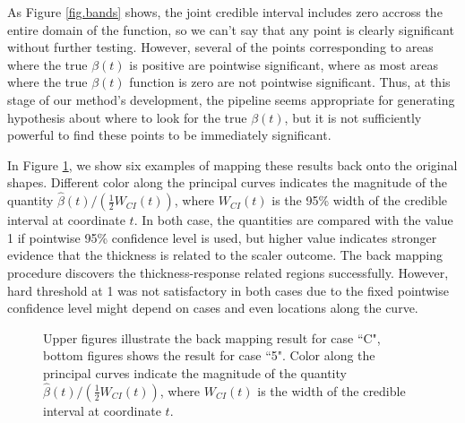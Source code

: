 \documentclass[12pt]{article}
\begin{document}
As Figure \ref{fig.bands} shows, the joint credible interval includes zero accross the entire domain of the function, so we can't say that any point is clearly significant without further testing. However, several of the points corresponding to areas where the true $\beta(t)$ is positive are pointwise significant, where as most areas where the true $\beta(t)$ function is zero are not pointwise significant. Thus, at this stage of our method's development, the pipeline seems appropriate for generating hypothesis about where to look for the true $\beta(t)$, but it is not sufficiently powerful to find these points to be immediately significant.

In Figure \ref{fig.final}, we show six examples of mapping these results back onto the original shapes. Different color along the principal curves indicates the magnitude of the quantity $\hat{\beta}(t)\Big/(\frac{1}{2}W_{CI}(t))$, where $W_{CI}(t)$ is the 95\% width of the credible interval at coordinate $t$. In both case, the quantities are compared with the value 1 if pointwise 95\% confidence level is used, but higher value indicates stronger evidence that the thickness is related to the scaler outcome. The back mapping procedure discovers the thickness-response related regions successfully. However, hard threshold at 1 was not satisfactory in both cases due to the fixed pointwise confidence level might depend on cases and even locations along the curve.

\begin{figure}[H]
\caption[Back-mapping]{\footnotesize Upper figures illustrate the back mapping result for case ``C", bottom figures shows the result for case ``5". Color along the principal curves indicate the magnitude of the quantity $\hat{\beta}(t)\Big/(\frac{1}{2}W_{CI}(t))$, where $W_{CI}(t)$ is the width of the credible interval at coordinate $t$.}
\label{fig.final}
\begin{minipage}[b]{1\linewidth}
\centering
{}
\end{minipage}
\end{figure}\
\end{document}
